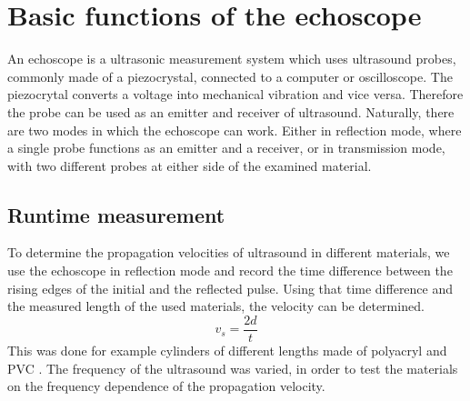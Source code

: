 \documentclass[a4paper,10pt,twocolumn]{article}
\begin{document}
    
    
    \section{Basic functions of the echoscope}\label{BasicFunctions}
    An echoscope is a ultrasonic measurement system which uses ultrasound probes, commonly made of a piezocrystal, connected to a computer or oscilloscope.
    The piezocrytal converts a voltage into mechanical vibration and vice versa.
    Therefore the probe can be used as an emitter and receiver of ultrasound.
    Naturally, there are two modes in which the echoscope can work.
    Either in reflection mode, where a single probe functions as an emitter and a receiver, or in transmission mode, with two different probes at either side of the examined material.
    
    \subsection{Runtime measurement}\label{RuntimeMeasurement}
    To determine the propagation velocities of ultrasound in different materials, we use the echoscope in reflection mode and record the time difference between the 
    rising edges of the initial and the reflected pulse.
    Using that time difference and the measured length of the used materials, the velocity can be determined.
    \begin{equation}
        v_s = \frac{2d}{t}
    \end{equation}
    This was done for example cylinders of different lengths made of polyacryl and PVC .
    The frequency of the ultrasound was varied, in order to test the materials on the frequency dependence of the propagation velocity.
\end{document}

